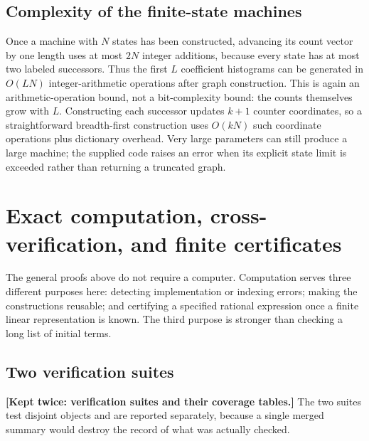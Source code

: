 \documentclass[11pt,letterpaper]{article}
\numberwithin{equation}{section}
\theoremstyle{definition}
\theoremstyle{remark}
\begin{document}
\subsection{Complexity of the finite-state machines}

Once a machine with $N$ states has been constructed, advancing its count
vector by one length uses at most $2N$ integer additions, because every
state has at most two labeled successors. Thus the first $L$ coefficient
histograms can be generated in $O(LN)$ integer-arithmetic operations after
graph construction. This is again an arithmetic-operation bound, not a
bit-complexity bound: the counts themselves grow with $L$. Constructing each
successor updates $k+1$ counter coordinates, so a straightforward
breadth-first construction uses $O(kN)$ such coordinate operations plus
dictionary overhead. Very large parameters can still produce a large
machine; the supplied code raises an error when its explicit state limit is
exceeded rather than returning a truncated graph.

\section{Exact computation, cross-verification, and finite certificates}
\label{sec:verification}

The general proofs above do not require a computer. Computation serves
three different purposes here: detecting implementation or indexing errors;
making the constructions reusable; and certifying a specified rational
expression once a finite linear representation is known. The third purpose
is stronger than checking a long list of initial terms.

\subsection{Two verification suites}
\label{sec:suites}

\noindent\textbf{[Kept twice: verification suites and their coverage
tables.]}
The two suites test disjoint objects and are reported separately, because a
single merged summary would destroy the record of what was actually
checked.
\end{document}
